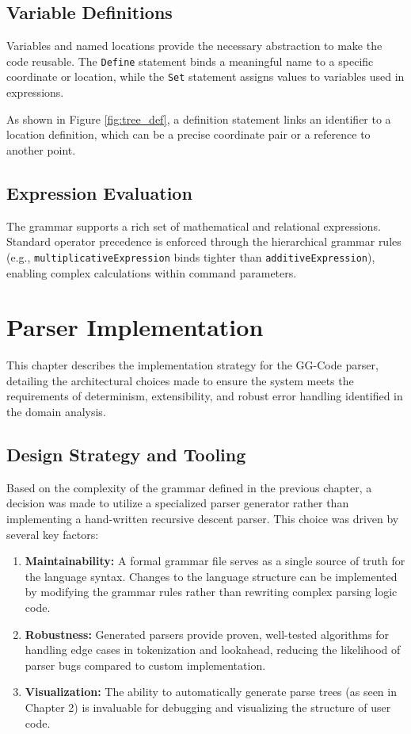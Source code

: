\section{Variable Definitions}
Variables and named locations provide the necessary abstraction to make the code reusable. The \texttt{Define} statement binds a meaningful name to a specific coordinate or location, while the \texttt{Set} statement assigns values to variables used in expressions.



As shown in Figure \ref{fig:tree_def}, a definition statement links an identifier to a location definition, which can be a precise coordinate pair or a reference to another point.

\section{Expression Evaluation}
The grammar supports a rich set of mathematical and relational expressions. Standard operator precedence is enforced through the hierarchical grammar rules (e.g., \texttt{multiplicativeExpression} binds tighter than \texttt{additiveExpression}), enabling complex calculations within command parameters.

\chapter{Parser Implementation}

This chapter describes the implementation strategy for the GG-Code parser, detailing the architectural choices made to ensure the system meets the requirements of determinism, extensibility, and robust error handling identified in the domain analysis.

\section{Design Strategy and Tooling}
Based on the complexity of the grammar defined in the previous chapter, a decision was made to utilize a specialized parser generator rather than implementing a hand-written recursive descent parser. This choice was driven by several key factors:

\begin{enumerate}
    \item \textbf{Maintainability:} A formal grammar file serves as a single source of truth for the language syntax. Changes to the language structure can be implemented by modifying the grammar rules rather than rewriting complex parsing logic code.
    \item \textbf{Robustness:} Generated parsers provide proven, well-tested algorithms for handling edge cases in tokenization and lookahead, reducing the likelihood of parser bugs compared to custom implementation.
    \item \textbf{Visualization:} The ability to automatically generate parse trees (as seen in Chapter 2) is invaluable for debugging and visualizing the structure of user code.
\end{enumerate}


